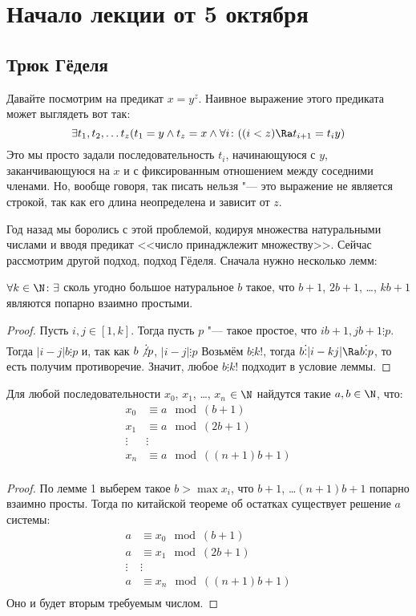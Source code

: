 
\section{Начало лекции от 5 октября}
\subsection{Трюк Гёделя}

Давайте посмотрим на предикат $x=y^z$.
Наивное выражение этого предиката может выглядеть вот так:
\[ \exists t_1, t_2, \dots t_z (t_1 = y \land t_z = x \land \forall i \colon ((i < z) \Ra t_{i+1}=t_iy) \]
Это мы просто задали последовательность $t_i$, начинающуюся с $y$, заканчивающуюся на $x$ и
с фиксированным отношением между соседними членами.
Но, вообще говоря, так писать нельзя "--- это выражение не является строкой, так как его длина неопределена
и зависит от $z$.

Год назад мы боролись с этой проблемой, кодируя множества натуральными числами и вводя
предикат <<число принаджлежит множеству>>.
Сейчас рассмотрим другой подход, подход Гёделя.
Сначала нужно несколько лемм:

\begin{lemma}
	$\forall k \in \N \colon \exists$ сколь угодно большое натуральное $b$ такое,
	что $b+1$, $2b+1$, \dots, $kb+1$ являются попарно взаимно простыми.
\end{lemma}
\begin{proof}
	Пусть $i, j \in [1, k]$.
	Тогда пусть $p$ "--- такое простое, что $ib+1, jb+1 \vdots p$.
	Тогда $|i-j|b \vdots p$ и, так как $b \not\vdots p$, $|i-j| \vdots p$
	Возьмём $b \vdots k!$, тогда $b \vdots |i - kj| \Ra b \vdots p$, то есть получим противоречие.
	Значит, любое $b \vdots k!$ подходит в условие леммы.
\end{proof}

\begin{lemma}
	Для любой последовательности $x_0$, $x_1$, \dots, $x_n$ $\in \N$ найдутся такие
	$a, b \in \N$, что:
	\begin{align*}
		x_0 &\equiv a \mod (b + 1) \\
		x_1 &\equiv a \mod (2b + 1) \\
		\vdots & \vdots \\
		x_n &\equiv a \mod ((n+1)b + 1) \\
	\end{align*}
\end{lemma}
\begin{proof}
	По лемме 1 выберем такое $b > \max x_i$, что $b+1$, \dots $(n+1)b+1$ попарно взаимно просты.
	Тогда по китайской теореме об остатках существует решение $a$ системы:
	\begin{align*}
		a &\equiv x_0 \mod (b + 1) \\
		a &\equiv x_1 \mod (2b + 1) \\
		\vdots & \vdots \\
		a &\equiv x_n \mod ((n+1)b + 1) \\
	\end{align*}
	Оно и будет вторым требуемым числом.
\end{proof}

